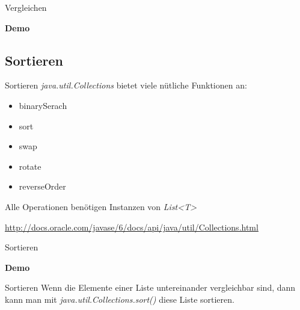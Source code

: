 \documentclass[18pt]{beamer}
\begin{document}

\begin{frame}{Vergleichen}
	\begin{center}
		\begin{Huge}
			\textbf{Demo}
		\end{Huge}
	\end{center}
\end{frame}

\subsection*{Sortieren}
\begin{frame}{Sortieren}
	\emph{java.util.Collections} bietet viele nütliche Funktionen an:
	\begin{itemize}
		\item binarySerach
		\item sort
		\item swap
		\item rotate
		\item reverseOrder
	\end{itemize}
	
	Alle Operationen benötigen Instanzen von \emph{List<T>}

	\url{http://docs.oracle.com/javase/6/docs/api/java/util/Collections.html}
\end{frame}


\begin{frame}{Sortieren}
	\begin{center}
		\begin{Huge}
			\textbf{Demo}
		\end{Huge}
	\end{center}
\end{frame}


\begin{frame}{Sortieren}
	Wenn die Elemente einer Liste untereinander vergleichbar sind, dann kann man mit \emph{java.util.Collections.sort()} diese Liste sortieren.
\end{frame}

\end{document}
